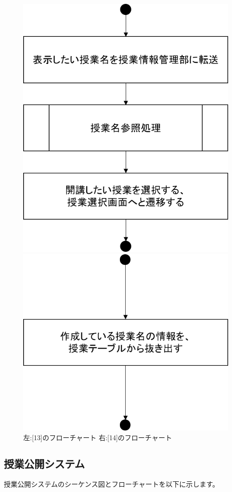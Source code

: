 \begin{figure}[htbp]
 \begin{minipage}{0.5\hsize}
  \begin{center}
   \includegraphics[width=0.45\linewidth,clip]{./img/takeover_lecture/sub13.png}
  \end{center}
 \end{minipage}
 \begin{minipage}{0.5\hsize}
  \begin{center}
   \includegraphics[width=0.45\linewidth,clip]{./img/takeover_lecture/sub14.png}
  \end{center}
 \end{minipage}
 \caption{左:[13]のフローチャート 右:[14]のフローチャート}\label{fig:takeoverlectureflow6}
\end{figure}

\newpage
\subsection{授業公開システム}
授業公開システムのシーケンス図とフローチャートを以下に示します。


